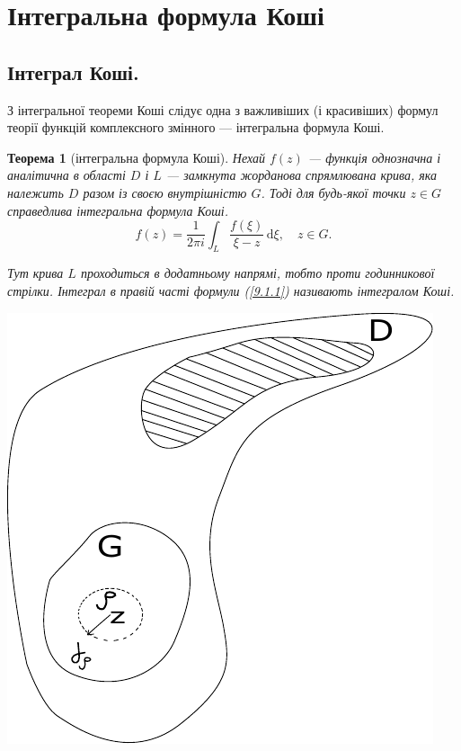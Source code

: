 \documentclass[12pt,fleqn]{article}
\theoremstyle{theorem}
\newtheorem{thm}{Теорема}[section]
\theoremstyle{proof}
\numberwithin{figure}{section}
\numberwithin{equation}{section}
\begin{document}
\newpage

\section{Інтегральна формула Коші}\label{9}\allowdisplaybreaks

\subsection{Інтеграл Коші.}\label{9.1}
З інтегральної теореми Коші слідує одна з важливіших (і красивіших) формул теорії функцій комплексного змінного --- інтегральна формула Коші.
\begin{thm}[інтегральна формула Коші]
Нехай $f(z)$ --- функція однозначна і аналітична в області $D$ і $L$ --- замкнута жорданова спрямлювана крива, яка належить $D$ разом із своєю внутрішністю $G$. Тоді для будь-якої точки $z\in G$ справедлива інтегральна формула Коші.
\begin{equation}\label{9.1.1}
f(z)=\frac{1}{2\pi i}\int_{L}\frac{f(\xi)}{\xi - z}\,\mathrm{d}\xi, \quad z\in G.
\end{equation}

Тут крива $L$ проходиться в додатньому напрямі, тобто проти годинникової стрілки. Інтеграл в правій часті формули (\ref{9.1.1}) називають інтегралом Коші.
\begin{center}
  \includegraphics{fig3}
\end{center}
\end{thm}
\end{document}
